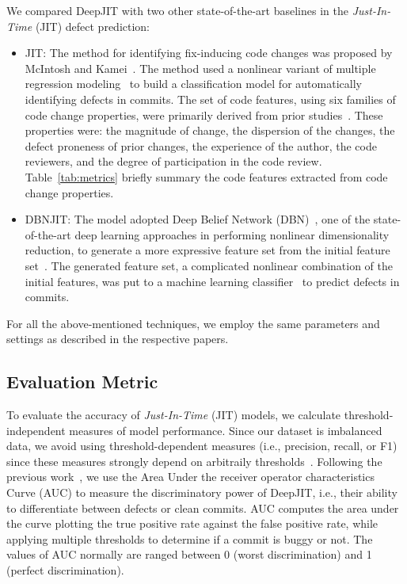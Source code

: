 We compared DeepJIT with two other state-of-the-art baselines in the \emph{Just-In-Time} (JIT) defect prediction:
\begin{itemize}
\item JIT: The method for identifying fix-inducing code changes was proposed by McIntosh and Kamei~\cite{mcintosh2018fix}. The method used a nonlinear variant of multiple regression modeling~\cite{fox1997applied} to build a classification model for automatically identifying defects in commits. The set of code features, using six families of code change properties, were primarily derived from prior studies~\cite{Kamei:2013:LES, Kim:2008:CSC, Kononenko:2015, Mockus2000}. These properties were: the magnitude of change, the dispersion of the changes, the defect proneness of prior changes, the experience of the author, the code reviewers, and the degree of participation in the code review. Table~\ref{tab:metrics} briefly summary the code features extracted from code change properties.
\item DBNJIT: The model adopted Deep Belief Network (DBN)~\cite{hinton2006reducing}, one of the state-of-the-art deep learning approaches in performing nonlinear dimensionality reduction, to generate a more expressive feature set from the initial feature set~\cite{Yang:2015:DLJ}. The generated feature set, a complicated nonlinear combination of the initial features, was put to a machine learning classifier~\cite{nasrabadi2007pattern} to predict defects in commits. 
\end{itemize}

For all the above-mentioned techniques, we employ the same parameters and settings as described in the respective papers. 

\subsection{Evaluation Metric}
\label{sec:metric}
To evaluate the accuracy of \emph{Just-In-Time} (JIT) models, we calculate  threshold-independent measures of model performance. Since our dataset is imbalanced data, we avoid using threshold-dependent measures (i.e., precision, recall, or F1) since these measures strongly depend on arbitraily thresholds~\cite{nguyen2009learning, gu2008data}. Following the previous work~\cite{mcintosh2018fix},  we use the Area Under the receiver operator characteristics
Curve (AUC) to measure the discriminatory power of DeepJIT, i.e., their ability to differentiate between defects or clean commits. AUC computes the area under the curve plotting the true positive rate against the false positive rate, while applying multiple thresholds to determine if a commit is buggy or not. The values of AUC normally are ranged between 0 (worst discrimination) and 1 (perfect discrimination).

